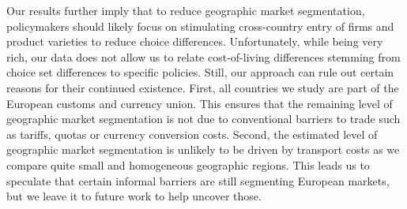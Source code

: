 Our results further imply that to reduce geographic market segmentation, policymakers should likely focus on stimulating cross-country entry of firms and product varieties to reduce choice differences. Unfortunately, while being very rich, our data does not allow us to relate cost-of-living differences stemming from choice set differences to specific policies. Still, our approach can rule out certain reasons for their continued existence. First, all countries we study are part of the European customs and currency union. This ensures that the remaining level of geographic market segmentation is not due to conventional barriers to trade such as tariffs, quotas or currency conversion costs. Second, the estimated level of geographic market segmentation is unlikely to be driven by transport costs as we compare quite small and homogeneous geographic regions. This leads us to speculate that certain informal barriers are still segmenting European markets, but we leave it to future work to help uncover those. 